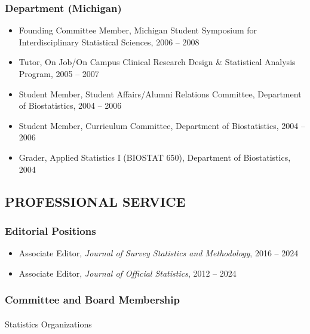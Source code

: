 \documentclass[
  english,
  letterpaper,
  DIV=11,
  numbers=noendperiod]{scrartcl}
\makeatletter
\let\oldparagraph\paragraph
\renewcommand{\paragraph}{
    \@ifstar
      \xxxParagraphStar
      \xxxParagraphNoStar
  }
\newcommand{\xxxParagraphStar}[1]{\oldparagraph*{#1}\mbox{}}
\newcommand{\xxxParagraphNoStar}[1]{\oldparagraph{#1}\mbox{}}
\providecommand{\tightlist}{%
  \setlength{\itemsep}{0pt}\setlength{\parskip}{0pt}}
\makeatother
\begin{document}
\subsubsection{Department (Michigan)}\label{department-michigan}

\begin{itemize}
\tightlist
\item
  Founding Committee Member, Michigan Student Symposium for
  Interdisciplinary Statistical Sciences, 2006 -- 2008
\item
  Tutor, On Job/On Campus Clinical Research Design \& Statistical
  Analysis Program, 2005 -- 2007
\item
  Student Member, Student Affairs/Alumni Relations Committee, Department
  of Biostatistics, 2004 -- 2006
\item
  Student Member, Curriculum Committee, Department of Biostatistics,
  2004 -- 2006
\item
  Grader, Applied Statistics I (BIOSTAT 650), Department of
  Biostatistics, 2004
\end{itemize}

\subsection{PROFESSIONAL SERVICE}\label{professional-service}

\subsubsection{Editorial Positions}\label{editorial-positions}

\begin{itemize}
\tightlist
\item
  Associate Editor, \emph{Journal of Survey Statistics and Methodology},
  2016 -- 2024
\item
  Associate Editor, \emph{Journal of Official Statistics}, 2012 -- 2024
\end{itemize}

\subsubsection{Committee and Board
Membership}\label{committee-and-board-membership}

\paragraph{Statistics Organizations}\label{statistics-organizations}
\end{document}
